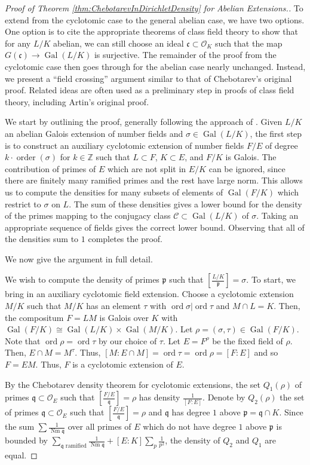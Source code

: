 \documentclass[12pt]{amsart}
\theoremstyle{definition}
\theoremstyle{remark}
\numberwithin{equation}{section}
\newcommand{\cC}{\mathcal C}
\newcommand{\cO}{\mathcal O}
\newcommand{\fkc}{\mathfrak c}
\newcommand{\fkp}{\mathfrak p}
\newcommand{\fkq}{\mathfrak q}
\newcommand{\bbZ}{\mathbb Z}
\DeclareMathOperator{\norm}{Nm}
\newcommand{\artin}[2]{\left[ \frac{#1}{#2}\right]}
\DeclareMathOperator{\Gal}{Gal}
\DeclareMathOperator{\ord}{ord}
\DeclareMathOperator{\order}{order}
\begin{document}
\begin{proof}[Proof of Theorem \ref{thm:ChebotarevInDirichletDensity} for Abelian Extensions.]
To extend from the cyclotomic case to the general abelian case, we have two options. One option is to cite the appropriate theorems of class field theory to show that for any $L/K$ abelian, we can still choose an ideal $\fkc \subset \cO_{K}$ such that the map $G(\fkc) \to \Gal(L/K)$ is surjective. The remainder of the proof from the cyclotomic case then goes through for the abelian case nearly unchanged. Instead, we present a ``field crossing'' argument similar to that of Chebotarev's original proof. Related ideas are often used as a preliminary step in proofs of class field theory, including Artin's original proof.

We start by outlining the proof, generally following the approach of \cite{FriedJarden08}. Given $L/K$ an abelian Galois extension of number fields and $\sigma \in \Gal(L/K)$, the first step is to construct an auxiliary cyclotomic extension of number fields $F/E$ of degree $k \cdot \order(\sigma)$ for $k \in \bbZ$ such that $L \subset F$, $K \subset E$, and $F/K$ is Galois. The contribution of primes of $E$ which are not split in $E/K$ can be ignored, since there are finitely many ramified primes and the rest have large norm. This allows us to compute the densities for many subsets of elements of $\Gal(F/K)$ which restrict to $\sigma$ on $L$. The sum of these densities gives a lower bound for the density of the primes mapping to the conjugacy class $\cC \subset \Gal(L/K)$ of $\sigma$. Taking an appropriate sequence of fields gives the correct lower bound. Observing that all of the densities sum to $1$ completes the proof. 

We now give the argument in full detail.

We wish to compute the density of primes $\fkp$ such that $\artin{L/K}{\fkp} = \sigma$. To start, we bring in an auxiliary cyclotomic field extension. Choose a cyclotomic extension $M/K$ such that $M/K$ has an element $\tau$ with $\ord \sigma|\ord \tau$ and $M \cap L = K$. Then, the compositum $F = LM$ is Galois over $K$ with $\Gal(F/K) \cong \Gal(L/K) \times \Gal(M/K)$. Let $\rho = (\sigma, \tau) \in \Gal(F/K)$. Note that $\ord \rho = \ord \tau$ by our choice of $\tau$. Let $E = F^{\rho}$ be the fixed field of $\rho$. Then, $E \cap M = M^{\tau}$. Thus, $[M:E\cap M] = \ord \tau = \ord \rho = [F:E]$ and so $F = EM$. Thus, $F$ is a cyclotomic extension of $E$.

By the Chebotarev density theorem for cyclotomic extensions, the set $Q_1(\rho)$ of primes $\fkq \subset \cO_{E}$ such that $\artin{F/E}{\fkq} = \rho$ has density $\frac{1}{[F:E]}$. Denote by $Q_2(\rho)$ the set of primes $\fkq \subset \cO_{E}$ such that $\artin{F/E}{\fkq} = \rho$ and $\fkq$ has degree $1$ above $\fkp = \fkq \cap K$. Since the sum $\sum \frac{1}{\norm \fkq}$ over all primes of $E$ which do not have degree $1$ above $\fkp$ is bounded by $\sum_{\fkq \text{ ramified}} \frac{1}{\norm \fkq} + [E:K] \sum_{p} \frac{1}{p^2}$, the density of $Q_2$ and $Q_1$ are equal.


\end{proof}
\end{document}
